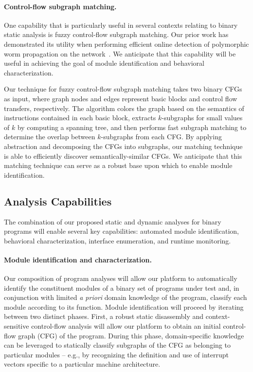 \documentclass[letterpaper,twoside,11pt,headings=small]{scrartcl}
\begin{document}
\paragraph{Control-flow subgraph matching.} One capability that is
particularly useful in several contexts relating to binary static analysis is
fuzzy control-flow subgraph matching.  Our prior work has demonstrated its
utility when performing efficient online detection of polymorphic worm
propagation on the network~\cite{kruegel:raid2005:worm}. We anticipate that
this capability will be useful in achieving the goal of module identification
and behavioral characterization.

Our technique for fuzzy control-flow subgraph matching takes two binary CFGs
as input, where graph nodes and edges represent basic blocks and control flow
transfers, respectively.  The algorithm colors the graph based on the
semantics of instructions contained in each basic block, extracts
$k$-subgraphs for small values of $k$ by computing a spanning tree, and then
performs fast subgraph matching to determine the overlap between $k$-subgraphs
from each CFG. By applying abstraction and decomposing the CFGs into
subgraphs, our matching technique is able to efficiently discover
semantically-similar CFGs.  We anticipate that this matching technique can
serve as a robust base upon which to enable module identification.

\subsection{Analysis Capabilities}
\label{sec:research:structure:modules}

The combination of our proposed static and dynamic analyses for binary
programs will enable several key capabilities: automated module
identification, behavioral characterization, interface enumeration, and
runtime monitoring.

\paragraph{Module identification and characterization.} Our composition of
program analyses will allow our platform to automatically identify the
constituent modules of a binary set of programs under test and, in conjunction
with limited \emph{a priori} domain knowledge of the program, classify each
module according to its function.  Module identification will proceed by
iterating between two distinct phases. First, a robust static disassembly and
context-sensitive control-flow analysis will allow our platform to obtain an
initial control-flow graph (CFG) of the program. During this phase,
domain-specific knowledge can be leveraged to statically classify subgraphs of
the CFG as belonging to particular modules -- e.g., by recognizing the
definition and use of interrupt vectors specific to a particular machine
architecture.
\end{document}
